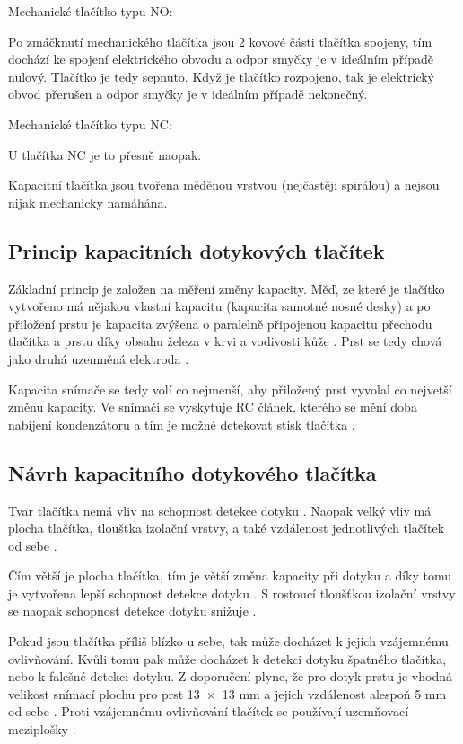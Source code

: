 Mechanické tlačítko typu NO: %

Po zmáčknutí mechanického tlačítka jsou 2 kovové části tlačítka spojeny, tím dochází ke spojení elektrického obvodu 
a odpor smyčky je v ideálním případě nulový. Tlačítko je tedy sepnuto. Když je tlačítko rozpojeno, tak je 
elektrický obvod přerušen a odpor smyčky je v ideálním případě nekonečný.

Mechanické tlačítko typu NC: %

U tlačítka NC je to přesně naopak. %


Kapacitní tlačítka jsou tvořena měděnou vrstvou (nejčastěji spirálou) a nejsou nijak mechanicky namáhána.


\subsection{Princip kapacitních dotykových tlačítek}
Základní princip je založen na měření změny kapacity. Měď, ze které je tlačítko vytvořeno má
nějakou vlastní kapacitu (kapacita samotné nosné desky) a po přiložení prstu je kapacita zvýšena o paralelně 
připojenou kapacitu přechodu tlačítka a prstu díky obsahu železa v krvi a vodivosti kůže \cite{PrincipKapTl}. 
Prst se tedy chová jako druhá uzemněná elektroda \cite{PrincipKapTl}. 

Kapacita snímače se tedy volí co nejmenší, aby přiložený prst vyvolal co nejvetší změnu kapacity. Ve snímači se vyskytuje
RC článek, kterého se mění doba nabíjení kondenzátoru a tím je možné detekovat stisk tlačítka \cite{PrincipKapTl}. 

\subsection{Návrh kapacitního dotykového tlačítka}
Tvar tlačítka nemá vliv na schopnost detekce dotyku \cite{PrincipKapTl}. Naopak velký vliv má plocha tlačítka, tloušťka
izolační vrstvy, a také vzdálenost jednotlivých tlačítek od sebe \cite{PrincipKapTl}. 

Čím větší je plocha tlačítka, tím je větší změna kapacity při dotyku a díky tomu je vytvořena lepší schopnost detekce 
dotyku \cite{PrincipKapTl}. S rostoucí tloušťkou izolační vrstvy se naopak schopnost detekce dotyku snižuje \cite{PrincipKapTl}.

Pokud jsou tlačítka příliš blízko u sebe, tak může docházet k jejich vzájemnému ovlivňování. Kvůli tomu pak může docházet k
detekci dotyku špatného tlačítka, nebo k falešné detekci dotyku. Z doporučení plyne, že pro dotyk prstu je vhodná velikost snímací 
plochu pro prst 13~$\times$~13 mm a jejich vzdálenost alespoň 5 mm od sebe \cite{PrincipKapTl}. Proti vzájemnému ovlivňování tlačítek
se používají uzemňovací meziplošky \cite{PrincipKapTl}.

